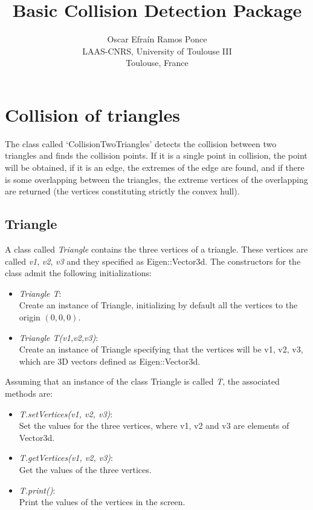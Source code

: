 \documentclass[11pt,a4paper]{article}
\title{\textbf{Basic Collision Detection Package}}
\author{Oscar Efra\'{i}n Ramos Ponce \\
  LAAS-CNRS, University of Toulouse III \\
  Toulouse, France}
\date{}
\begin{document}
\maketitle


\section{Collision of triangles}

The class called `CollisionTwoTriangles' detects the collision between two triangles and finds the collision points. If it is a single point in collision, the point will be obtained, if it is an edge, the extremes of the edge are found, and if there is some overlapping between the triangles, the extreme vertices of the overlapping  are returned (the vertices constituting strictly the convex hull).

\subsection{Triangle}
A class called \textit{Triangle} contains the three vertices of a triangle. These vertices are called \textit{v1}, \textit{v2}, \textit{v3} and they specified as Eigen::Vector3d. The constructors for the class admit the following initializations:
\begin{itemize}
  \item \emph{Triangle T}: \\Create an instance of Triangle, initializing by default all the vertices to the origin $(0,0,0)$.
  \item \emph{Triangle T(v1,v2,v3)}: \\Create an instance of Triangle specifying that the vertices will be v1, v2, v3, which are 3D vectors defined as Eigen::Vector3d.
\end{itemize}
Assuming that an instance of the class Triangle is called \textit{T}, the associated methods are:
\begin{itemize}
  \item \emph{T.setVertices(v1, v2, v3)}: \\Set the values for the three vertices, where v1, v2 and v3 are elements of Vector3d.
  \item \emph{T.getVertices(v1, v2, v3)}: \\Get the values of the three vertices.
  \item \emph{T.print()}: \\Print the values of the vertices in the screen.
\end{itemize}
\end{document}
